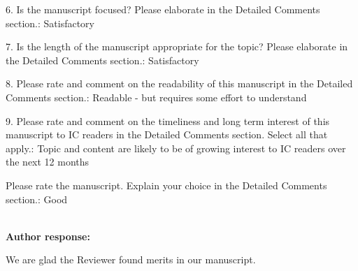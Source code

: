 \documentclass{article}
\newcounter{reviewer}
\newcounter{comment}[reviewer]
\newcommand{\reply}[1]{	\\[2pt]
	\textbf{Author response:} 	
	#1
}
\begin{document}
{	6. Is the manuscript focused? Please elaborate in the Detailed Comments section.: Satisfactory
	
	7. Is the length of the manuscript appropriate for the topic? Please elaborate in the Detailed Comments section.: Satisfactory
	
	8. Please rate and comment on the readability of this manuscript in the Detailed Comments section.: Readable - but requires some effort to understand
	
	9. Please rate and comment on the timeliness and long term interest of this manuscript to IC readers in the Detailed Comments section. Select all that apply.: Topic and content are likely to be of growing interest to IC readers over the next 12 months
	
	Please rate the manuscript. Explain your choice in the Detailed Comments section.: Good 
}
\reply{
We are glad the Reviewer found merits in our manuscript.
}

%
%
\end{document}
